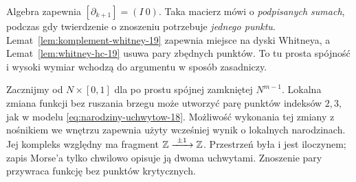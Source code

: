 \begin{uwaga}
Algebra zapewnia
$[\partial_{k+1}]=(I\ 0)$.
Taka macierz mówi o
\emph{podpisanych sumach},
podczas gdy twierdzenie
o znoszeniu potrzebuje
\emph{jednego punktu}.
Lemat~\ref{lem:komplement-whitney-19}
zapewnia miejsce
na dyski Whitneya,
a Lemat~\ref{lem:whitney-hc-19}
usuwa pary zbędnych
punktów. To tu
prosta spójność i
wysoki wymiar
wchodzą do argumentu
w sposób zasadniczy.
\end{uwaga}

\begin{przyklad}
Zacznijmy od
$N\times[0,1]$ dla
po prostu spójnej
zamkniętej $N^{m-1}$.
Lokalna zmiana
funkcji bez ruszania
brzegu może utworzyć
parę punktów
indeksów $2,3$,
jak w modelu
\eqref{eq:narodziny-uchwytow-18}.
Możliwość wykonania tej zmiany z nośnikiem we wnętrzu
zapewnia użyty wcześniej wynik o lokalnych narodzinach.
Jej kompleks względny
ma fragment
$\mathbb{Z}\xrightarrow{\ \pm1\ }\mathbb{Z}$.
Przestrzeń była i jest
iloczynem; zapis
Morse'a tylko
chwilowo opisuje ją
dwoma uchwytami.
Znoszenie pary
przywraca funkcję
bez punktów krytycznych.
\end{przyklad}

